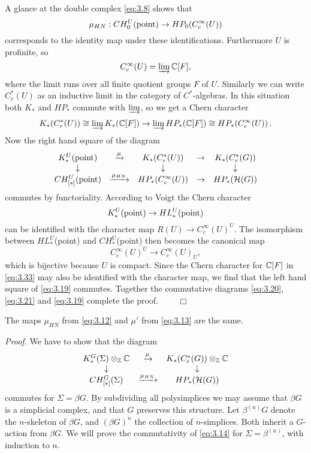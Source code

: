 A glance at the double complex \eqref{eq:3.8} shows that 
\[
\mu_{HN} : CH_0^U (\mathrm{point}) \to HP_0 (C_c^\infty (U))
\]
corresponds to the identity map under these identifications.
Furthermore $U$ is profinite, so
\[
C_c^\infty (U) = \varinjlim \mathbb C [F] ,
\]
where the limit runs over all finite quotient groups $F$ of $U$. Similarly we can write 
$C_r^* (U)$ as an inductive limit in the category of $C^*$-algebras. In this situation
both $K_*$ and $HP_*$ commute with $\varinjlim$, so we get a Chern character
\begin{equation}\label{eq:3.33}
K_* (C_r^* (U)) \cong \varinjlim K_* (\mathbb C [F]) \to 
 \varinjlim HP_* (\mathbb C [F]) \cong HP_* (C_c^\infty (U)) \,.
\end{equation}
Now the right hand square of the diagram
\begin{equation}\label{eq:3.19}
\begin{array}{ccccc}
K_*^U (\mathrm{point}) & \xrightarrow{\mu} & K_* (C_r^* (U)) &
\to & K_* (C_r^* (G)) \\
\downarrow & & \downarrow & & \downarrow \\
CH_{[*]}^U (\mathrm{point}) & \xrightarrow{\mu_{HN}} & HP_* (C_c^\infty (U)) &
\to & HP_* (\mathcal H (G))
\end{array}
\end{equation}
commutes by functoriality.
According to Voigt \cite[Proposition 13.5]{Voi3} the Chern character
\[
K_*^U (\mathrm{point}) \to HL_*^U (\mathrm{point})
\]
can be identified with the character map $R (U) \to C_c^\infty (U)^U$.
The isomorphism between $HL_*^U$(point) and $CH_*^U$(point)
then becomes the canonical map
\[
C_c^\infty (U)^U \to C_c^\infty (U)_U ,
\]
which is bijective because $U$ is compact. Since the Chern character for $\mathbb C [F]$ 
in \eqref{eq:3.33} may also be identified with the character map, we find that the 
left hand square of \eqref{eq:3.19} commutes. Together the commutative diagrams 
\eqref{eq:3.20}, \eqref{eq:3.21} and \eqref{eq:3.19} complete the proof. $\qquad \Box$
\\[2mm]
\begin{lem}\label{lem:3.6}
The maps $\mu_{HN}$ from \eqref{eq:3.12} and $\mu'$ from \eqref{eq:3.13} are the same.
\end{lem}
\emph{Proof.}
We have to show that the diagram
\begin{equation}\label{eq:3.14}
\begin{array}{ccc}
K_*^G (\Sigma) \otimes_{\mathbb Z} \mathbb C & \xrightarrow{\mu} & 
K_* (C_r^* (G)) \otimes_{\mathbb Z} \mathbb C \\
\downarrow & &\downarrow \\
CH^G_{[*]} (\Sigma) & \xrightarrow{\mu_{HN}} & HP_* (\mathcal H (G))
\end{array}
\end{equation}
commutes for $\Sigma = \beta G$.
By subdividing all polysimplices we may assume that $\beta G$ is a 
simplicial complex, and that $G$ preserves this structure. Let $\beta^{(n)} G$ 
denote the $n$-skeleton of $\beta G$, and $(\beta G)^n$ the collection of $n$-simplices. 
Both inherit a $G$-action from $\beta G$.
We will prove the commutativity of \eqref{eq:3.14} for $\Sigma = \beta^{(n)}$, with 
induction to $n$. 

